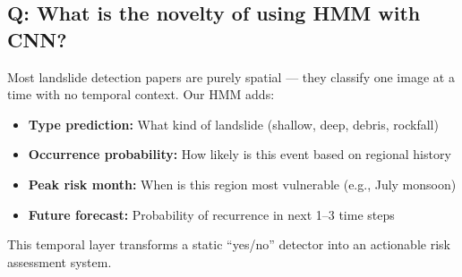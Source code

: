 \documentclass[11pt]{article}
\begin{document}
\subsection{Q: What is the novelty of using HMM with CNN?}

Most landslide detection papers are purely spatial --- they classify one image at a time with no temporal context. Our HMM adds:
\begin{itemize}[noitemsep]
    \item \textbf{Type prediction:} What kind of landslide (shallow, deep, debris, rockfall)
    \item \textbf{Occurrence probability:} How likely is this event based on regional history
    \item \textbf{Peak risk month:} When is this region most vulnerable (e.g., July monsoon)
    \item \textbf{Future forecast:} Probability of recurrence in next 1--3 time steps
\end{itemize}

This temporal layer transforms a static ``yes/no'' detector into an actionable risk assessment system.
\end{document}

